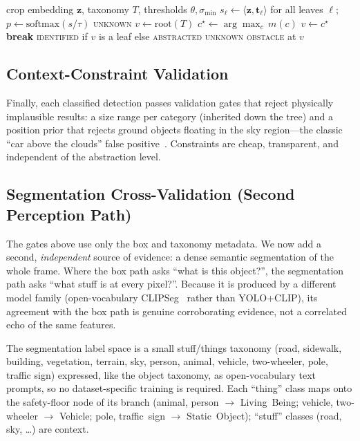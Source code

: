 \documentclass[conference]{IEEEtran}
\begin{document}
\begin{algorithm}[t]
\caption{Hierarchical abstraction with safety floor}
\label{alg:descent}
\begin{algorithmic}[1]
\REQUIRE crop embedding $\mathbf{z}$, taxonomy $T$, thresholds $\theta,\sigma_{\min}$
\STATE $s_\ell \gets \langle\mathbf{z},\mathbf{t}_\ell\rangle$ for all leaves $\ell$;\quad
       $p \gets \mathrm{softmax}(s/\tau)$
    \RETURN \textsc{unknown} 
\ENDIF
\STATE $v \gets \mathrm{root}(T)$
    \STATE $c^\star \gets \arg\max_{c}\, m(c)$ 
        \STATE $v \gets c^\star$
    \ELSE
        \STATE \textbf{break} 
    \ENDIF
\ENDWHILE
{}
    \RETURN \textsc{identified} if $v$ is a leaf else \textsc{abstracted}
\ELSE
    \RETURN \textsc{unknown obstacle} at $v$
\ENDIF
\end{algorithmic}
\end{algorithm}

\subsection{Context-Constraint Validation}
Finally, each classified detection passes validation gates that reject
physically implausible results: a size range per category (inherited down the
tree) and a position prior that rejects ground objects floating in the sky
region---the classic ``car above the clouds'' false positive~\cite{schaller2025}.
Constraints are cheap, transparent, and independent of the abstraction level.

\subsection{Segmentation Cross-Validation (Second Perception Path)}
\label{sec:segxval}
The gates above use only the box and taxonomy metadata. We now add a second,
\emph{independent} source of evidence: a dense semantic segmentation of the whole
frame. Where the box path asks ``what is this object?'', the segmentation path
asks ``what stuff is at every pixel?''. Because it is produced by a different
model family (open-vocabulary CLIPSeg~\cite{clipseg2022} rather than YOLO+CLIP),
its agreement with the box path is genuine corroborating evidence, not a
correlated echo of the same features.

The segmentation label space is a small stuff/things taxonomy (road, sidewalk,
building, vegetation, terrain, sky, person, animal, vehicle, two-wheeler, pole,
traffic sign) expressed, like the object taxonomy, as open-vocabulary text
prompts, so no dataset-specific training is required. Each ``thing'' class maps
onto the safety-floor node of its branch (\textsf{animal}, \textsf{person}
$\rightarrow$ \textsf{Living~Being}; \textsf{vehicle}, \textsf{two-wheeler}
$\rightarrow$ \textsf{Vehicle}; \textsf{pole}, \textsf{traffic~sign}
$\rightarrow$ \textsf{Static~Object}); ``stuff'' classes (road, sky, \ldots) are
context.
\end{document}
